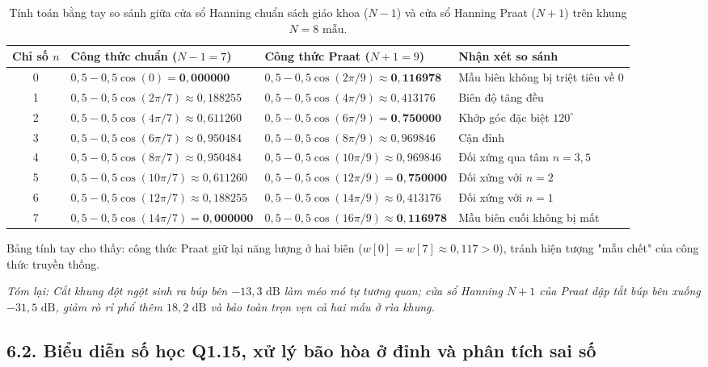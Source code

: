 \begin{table}[H]
\centering
\caption{Tính toán bằng tay so sánh giữa cửa sổ Hanning chuẩn sách giáo khoa ($N-1$) và cửa sổ Hanning Praat ($N+1$) trên khung $N = 8\text{ mẫu}$.}
\label{tab:ch06_hand_8samp}
\footnotesize
\begin{tabular}{clll}
\toprule
\textbf{Chỉ số $n$} & \textbf{Công thức chuẩn ($N-1 = 7$)} & \textbf{Công thức Praat ($N+1 = 9$)} & \textbf{Nhận xét so sánh} \\
\midrule
0 & $0{,}5 - 0{,}5\cos(0) = \mathbf{0{,}000000}$ & $0{,}5 - 0{,}5\cos(2\pi/9) \approx \mathbf{0{,}116978}$ & Mẫu biên không bị triệt tiêu về 0 \\
1 & $0{,}5 - 0{,}5\cos(2\pi/7) \approx 0{,}188255$ & $0{,}5 - 0{,}5\cos(4\pi/9) \approx 0{,}413176$ & Biên độ tăng đều \\
2 & $0{,}5 - 0{,}5\cos(4\pi/7) \approx 0{,}611260$ & $0{,}5 - 0{,}5\cos(6\pi/9) = \mathbf{0{,}750000}$ & Khớp góc đặc biệt $120^\circ$ \\
3 & $0{,}5 - 0{,}5\cos(6\pi/7) \approx 0{,}950484$ & $0{,}5 - 0{,}5\cos(8\pi/9) \approx 0{,}969846$ & Cận đỉnh \\
4 & $0{,}5 - 0{,}5\cos(8\pi/7) \approx 0{,}950484$ & $0{,}5 - 0{,}5\cos(10\pi/9) \approx 0{,}969846$ & Đối xứng qua tâm $n = 3{,}5$ \\
5 & $0{,}5 - 0{,}5\cos(10\pi/7) \approx 0{,}611260$ & $0{,}5 - 0{,}5\cos(12\pi/9) = \mathbf{0{,}750000}$ & Đối xứng với $n = 2$ \\
6 & $0{,}5 - 0{,}5\cos(12\pi/7) \approx 0{,}188255$ & $0{,}5 - 0{,}5\cos(14\pi/9) \approx 0{,}413176$ & Đối xứng với $n = 1$ \\
7 & $0{,}5 - 0{,}5\cos(14\pi/7) = \mathbf{0{,}000000}$ & $0{,}5 - 0{,}5\cos(16\pi/9) \approx \mathbf{0{,}116978}$ & Mẫu biên cuối không bị mất \\
\bottomrule
\end{tabular}
\end{table}

Bảng tính tay cho thấy: công thức Praat giữ lại năng lượng ở hai biên ($w[0] = w[7] \approx 0{,}117 > 0$), tránh hiện tượng "mẫu chết" của công thức truyền thống.

\textit{Tóm lại: Cắt khung đột ngột sinh ra búp bên $-13{,}3\text{ dB}$ làm méo mó tự tương quan; cửa sổ Hanning $N+1$ của Praat dập tắt búp bên xuống $-31{,}5\text{ dB}$, giảm rò rỉ phổ thêm $18{,}2\text{ dB}$ và bảo toàn trọn vẹn cả hai mẫu ở rìa khung.}


\subsection*{6.2. Biểu diễn số học Q1.15, xử lý bão hòa ở đỉnh và phân tích sai số}

